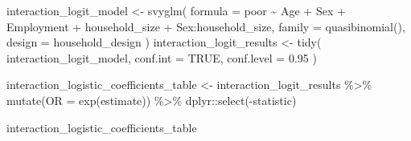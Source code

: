 \documentclass[
  spanish,
  11pt,
  letterpaper,
  oneside,
  open=any]{scrbook}
\newenvironment{Shaded}{\begin{snugshade}}{\end{snugshade}}
\newcommand{\AttributeTok}[1]{\textcolor[rgb]{0.40,0.45,0.13}{#1}}
\newcommand{\ConstantTok}[1]{\textcolor[rgb]{0.56,0.35,0.01}{#1}}
\newcommand{\FloatTok}[1]{\textcolor[rgb]{0.68,0.00,0.00}{#1}}
\newcommand{\FunctionTok}[1]{\textcolor[rgb]{0.28,0.35,0.67}{#1}}
\newcommand{\NormalTok}[1]{\textcolor[rgb]{0.00,0.23,0.31}{#1}}
\newcommand{\OtherTok}[1]{\textcolor[rgb]{0.00,0.23,0.31}{#1}}
\newcommand{\SpecialCharTok}[1]{\textcolor[rgb]{0.37,0.37,0.37}{#1}}
\begin{document}
\begin{Shaded}
\begin{Highlighting}[]
\NormalTok{interaction\_logit\_model }\OtherTok{\textless{}{-}} \FunctionTok{svyglm}\NormalTok{(}
  \AttributeTok{formula =}\NormalTok{ poor }\SpecialCharTok{\textasciitilde{}}\NormalTok{ Age }\SpecialCharTok{+}\NormalTok{ Sex }\SpecialCharTok{+}\NormalTok{ Employment }\SpecialCharTok{+}
\NormalTok{    household\_size }\SpecialCharTok{+}\NormalTok{ Sex}\SpecialCharTok{:}\NormalTok{household\_size,}
  \AttributeTok{family =} \FunctionTok{quasibinomial}\NormalTok{(),}
  \AttributeTok{design =}\NormalTok{ household\_design}
\NormalTok{)}
\NormalTok{interaction\_logit\_results }\OtherTok{\textless{}{-}} \FunctionTok{tidy}\NormalTok{(}
\NormalTok{  interaction\_logit\_model,}
  \AttributeTok{conf.int =} \ConstantTok{TRUE}\NormalTok{,}
  \AttributeTok{conf.level =} \FloatTok{0.95}
\NormalTok{)}

\NormalTok{interaction\_logistic\_coefficients\_table }\OtherTok{\textless{}{-}}\NormalTok{ interaction\_logit\_results }\SpecialCharTok{\%\textgreater{}\%}
  \FunctionTok{mutate}\NormalTok{(}\AttributeTok{OR =} \FunctionTok{exp}\NormalTok{(estimate)) }\SpecialCharTok{\%\textgreater{}\%}
\NormalTok{  dplyr}\SpecialCharTok{::}\FunctionTok{select}\NormalTok{(}\SpecialCharTok{{-}}\NormalTok{statistic)}

\NormalTok{interaction\_logistic\_coefficients\_table}
\end{Highlighting}
\end{Shaded}
\end{document}
